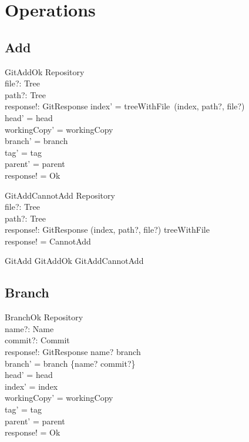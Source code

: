 \section{Operations}

\subsection{Add}

\begin{schema}{GitAddOk}
  \Delta Repository \\
  file?: Tree \\
  path?: Tree \\
  response!: GitResponse
\where
  index' = treeWithFile~(index, path?, file?) \\
  head' = head \\
  workingCopy' = workingCopy \\
  branch' = branch \\
  tag' = tag \\
  parent' = parent \\
  response! = Ok
\end{schema}

\begin{schema}{GitAddCannotAdd}
  \Xi Repository \\
  file?: Tree \\
  path?: Tree \\
  response!: GitResponse
\where
  (index, path?, file?) \notin \dom treeWithFile \\
  response! = CannotAdd
\end{schema}

\begin{zed}
  GitAdd  GitAddOk \lor GitAddCannotAdd
\end{zed}

\subsection{Branch}

\begin{schema}{BranchOk}
	\Delta Repository \\
	name?: Name \\
	commit?: Commit \\
	response!: GitResponse
\where
	name? \notin \dom branch \\
	branch' = branch \cup \{name? \mapsto commit?\} \\
	head' = head \\
	index' = index \\
	workingCopy' = workingCopy \\
	tag' = tag \\
	parent' = parent \\
	response! = Ok
\end{schema}

